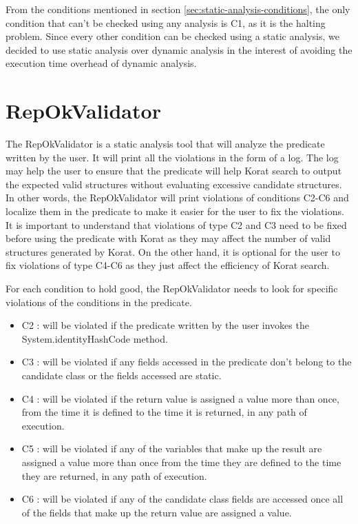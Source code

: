 \para From the conditions mentioned in section
\ref{sec:static-analysis-conditions}, the only condition that can’t be
checked using any analysis is C1, as it is the halting problem. Since
every other condition can be checked using a static analysis, we
decided to use static analysis over dynamic analysis in the interest
of avoiding the execution time overhead of dynamic analysis.

\section{RepOkValidator}
\label{sec:repokvalidator}
The RepOkValidator is a static analysis tool that will analyze the
predicate written by the user. It will print all the violations in the
form of a log. The log may help the user to ensure that the predicate
will help Korat search to output the expected valid structures without
evaluating excessive candidate structures. In other words, the
RepOkValidator will print violations of conditions C2-C6 and localize
them in the predicate to make it easier for the user to fix the
violations. It is important to understand that violations of type C2
and C3 need to be fixed before using the predicate with Korat as they
may affect the number of valid structures generated by Korat. On the
other hand, it is optional for the user to fix violations of type
C4-C6 as they just affect the efficiency of Korat search.

\para For each condition to hold good, the RepOkValidator needs to
look for specific violations of the conditions in the predicate.
\begin{itemize}
\item C2 : will be violated if the predicate written by the user
  invokes the System.identityHashCode method.
\item C3 : will be violated if any fields accessed in the predicate
  don’t belong to the candidate class or the fields accessed are
  static.
\item C4 : will be violated if the return value is assigned a value
  more than once, from the time it is defined to the time it is
  returned, in any path of execution.
\item C5 : will be violated if any of the variables that make up the
  result are assigned a value more than once from the time they are
  defined to the time they are returned, in any path of execution.
\item C6 : will be violated if any of the candidate class fields are
  accessed once all of the fields that make up the return value are
  assigned a value.
\end{itemize}

